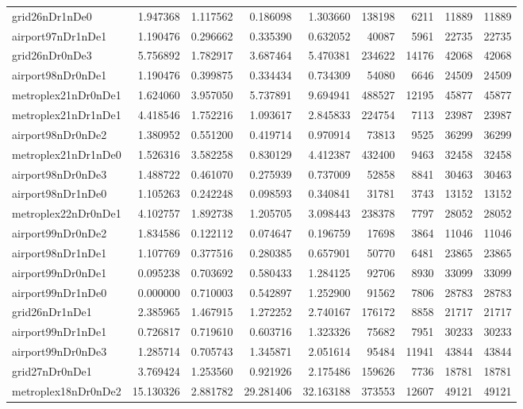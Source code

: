 \documentclass[../../../thesis.tex]{subfiles}
\begin{document}
\begin{longtable}{|l|r|r|r|r|r|r|r|r|}
grid26nDr1nDe0 & 1.947368 & 1.117562 & 0.186098 & 1.303660 & 138198 & 6211 & 11889 & 11889 \\
airport97nDr1nDe1 & 1.190476 & 0.296662 & 0.335390 & 0.632052 & 40087 & 5961 & 22735 & 22735 \\
grid26nDr0nDe3 & 5.756892 & 1.782917 & 3.687464 & 5.470381 & 234622 & 14176 & 42068 & 42068 \\
airport98nDr0nDe1 & 1.190476 & 0.399875 & 0.334434 & 0.734309 & 54080 & 6646 & 24509 & 24509 \\
metroplex21nDr0nDe1 & 1.624060 & 3.957050 & 5.737891 & 9.694941 & 488527 & 12195 & 45877 & 45877 \\
metroplex21nDr1nDe1 & 4.418546 & 1.752216 & 1.093617 & 2.845833 & 224754 & 7113 & 23987 & 23987 \\
airport98nDr0nDe2 & 1.380952 & 0.551200 & 0.419714 & 0.970914 & 73813 & 9525 & 36299 & 36299 \\
metroplex21nDr1nDe0 & 1.526316 & 3.582258 & 0.830129 & 4.412387 & 432400 & 9463 & 32458 & 32458 \\
airport98nDr0nDe3 & 1.488722 & 0.461070 & 0.275939 & 0.737009 & 52858 & 8841 & 30463 & 30463 \\
airport98nDr1nDe0 & 1.105263 & 0.242248 & 0.098593 & 0.340841 & 31781 & 3743 & 13152 & 13152 \\
metroplex22nDr0nDe1 & 4.102757 & 1.892738 & 1.205705 & 3.098443 & 238378 & 7797 & 28052 & 28052 \\
airport99nDr0nDe2 & 1.834586 & 0.122112 & 0.074647 & 0.196759 & 17698 & 3864 & 11046 & 11046 \\
airport98nDr1nDe1 & 1.107769 & 0.377516 & 0.280385 & 0.657901 & 50770 & 6481 & 23865 & 23865 \\
airport99nDr0nDe1 & 0.095238 & 0.703692 & 0.580433 & 1.284125 & 92706 & 8930 & 33099 & 33099 \\
airport99nDr1nDe0 & 0.000000 & 0.710003 & 0.542897 & 1.252900 & 91562 & 7806 & 28783 & 28783 \\
grid26nDr1nDe1 & 2.385965 & 1.467915 & 1.272252 & 2.740167 & 176172 & 8858 & 21717 & 21717 \\
airport99nDr1nDe1 & 0.726817 & 0.719610 & 0.603716 & 1.323326 & 75682 & 7951 & 30233 & 30233 \\
airport99nDr0nDe3 & 1.285714 & 0.705743 & 1.345871 & 2.051614 & 95484 & 11941 & 43844 & 43844 \\
grid27nDr0nDe1 & 3.769424 & 1.253560 & 0.921926 & 2.175486 & 159626 & 7736 & 18781 & 18781 \\
metroplex18nDr0nDe2 & 15.130326 & 2.881782 & 29.281406 & 32.163188 & 373553 & 12607 & 49121 & 49121 \\

\end{longtable}
\end{document}
